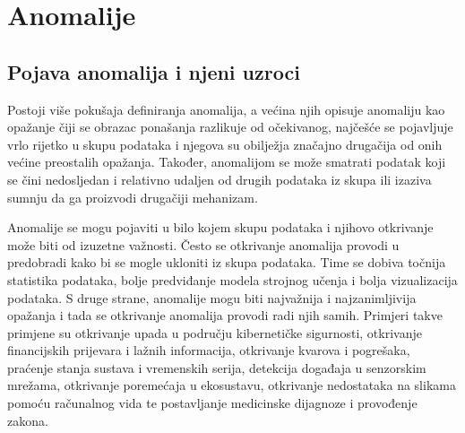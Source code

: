 \documentclass[utf8, diplomski, numeric]{fer}
\begin{document}
\chapter{Anomalije}
\section{Pojava anomalija i njeni uzroci}
Postoji više pokušaja definiranja anomalija, a većina njih opisuje anomaliju kao opažanje čiji se obrazac ponašanja razlikuje od očekivanog, najčešće se pojavljuje vrlo rijetko u skupu podataka i njegova su obilježja značajno drugačija od onih većine preostalih opažanja. Također, anomalijom se može smatrati podatak koji se čini nedosljedan i relativno udaljen od drugih podataka iz skupa ili izaziva sumnju da ga proizvodi drugačiji mehanizam.

Anomalije se mogu pojaviti u bilo kojem skupu podataka i njihovo otkrivanje može biti od izuzetne važnosti. Često se otkrivanje anomalija provodi u predobradi kako bi se mogle ukloniti iz skupa podataka. Time se dobiva točnija statistika podataka, bolje predviđanje modela strojnog učenja i bolja vizualizacija podataka. S druge strane, anomalije mogu biti najvažnija i najzanimljivija opažanja i tada se otkrivanje anomalija provodi radi njih samih. Primjeri takve primjene su otkrivanje upada u području kibernetičke sigurnosti, otkrivanje financijskih prijevara i lažnih informacija, otkrivanje kvarova i pogrešaka, praćenje stanja sustava i vremenskih serija, detekcija događaja u senzorskim mrežama, otkrivanje poremećaja u ekosustavu, otkrivanje nedostataka na slikama pomoću računalnog vida te postavljanje medicinske dijagnoze i provođenje zakona.
\end{document}
